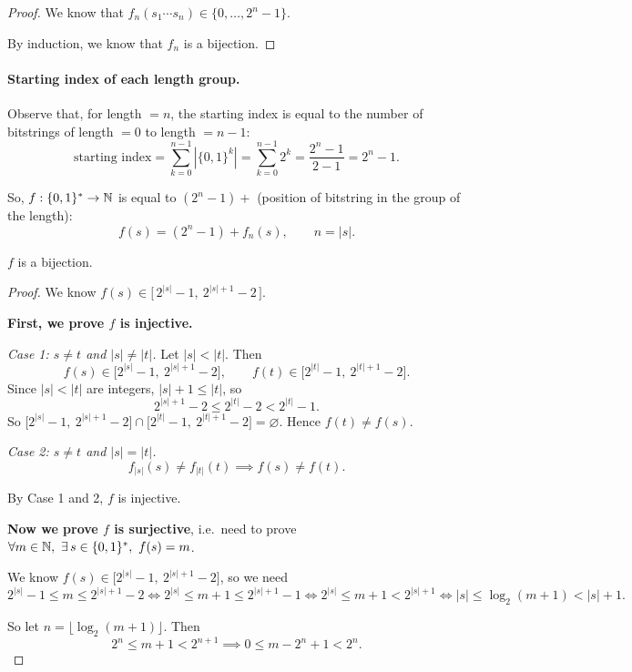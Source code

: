 \begin{solbox}[long]
\begin{solution}[(a)]
\begin{proof}
    We know that $f_n(s_1\cdots s_n)\in\{0,\dots,2^n-1\}$.

    By induction, we know that $f_n$ is a bijection.
\end{proof}

\paragraph{Starting index of each length group.} Observe that, for
length $=n$, the starting index is equal to the number of bitstrings of
length $=0$ to length $=n-1$:
\[
    \text{starting index} = \sum_{k=0}^{n-1} |\{0,1\}^k| = \sum_{k=0}^{n-1} 2^k
    = \frac{2^n-1}{2-1} = 2^n-1.
\]

So, $f : \{0,1\}^* \to \mathbb{N}$ is equal to $(2^n-1) + $ (position of bitstring
in the group of the length):
\[
    f(s) = (2^n-1) + f_n(s), \qquad n = |s|.
\]

\begin{claim}
    $f$ is a bijection.
\end{claim}
\begin{proof}
    We know $f(s) \in \big[\,2^{|s|}-1,\ 2^{|s|+1}-2\,\big]$.

    \textbf{First, we prove $f$ is injective.}

    \emph{Case 1: $s\ne t$ and $|s|\ne|t|$.} Let $|s|<|t|$. Then
    \[
        f(s) \in \big[2^{|s|}-1,\ 2^{|s|+1}-2\big], \qquad
        f(t) \in \big[2^{|t|}-1,\ 2^{|t|+1}-2\big].
    \]
    Since $|s|<|t|$ are integers, $|s|+1\le|t|$, so
    \[
        2^{|s|+1}-2 \le 2^{|t|}-2 < 2^{|t|}-1.
    \]
    So $\big[2^{|s|}-1,\ 2^{|s|+1}-2\big] \cap \big[2^{|t|}-1,\ 2^{|t|+1}-2\big]
    = \varnothing$. Hence $f(t)\ne f(s)$.

    \emph{Case 2: $s\ne t$ and $|s|=|t|$.}
    \[
        f_{|s|}(s) \ne f_{|t|}(t) \implies f(s) \ne f(t).
    \]

    By Case 1 and 2, $f$ is injective.

    \textbf{Now we prove $f$ is surjective}, i.e.\ need to prove
    $\forall m\in\N,\ \exists\, s\in\{0,1\}^*,\ f(s)=m$.

    We know $f(s) \in \big[2^{|s|}-1,\ 2^{|s|+1}-2\big]$, so we need
    \[
        2^{|s|}-1 \le m \le 2^{|s|+1}-2
        \iff
        2^{|s|} \le m+1 \le 2^{|s|+1}-1
        \iff
        2^{|s|} \le m+1 < 2^{|s|+1}
        \iff
        |s| \le \log_2(m+1) < |s|+1.
    \]

    So let $n = \lfloor \log_2(m+1) \rfloor$. Then
    \[
        2^n \le m+1 < 2^{n+1}
        \implies
        0 \le m - 2^n + 1 < 2^n.
    \]


\end{proof}
\end{solution}
\end{solbox}
